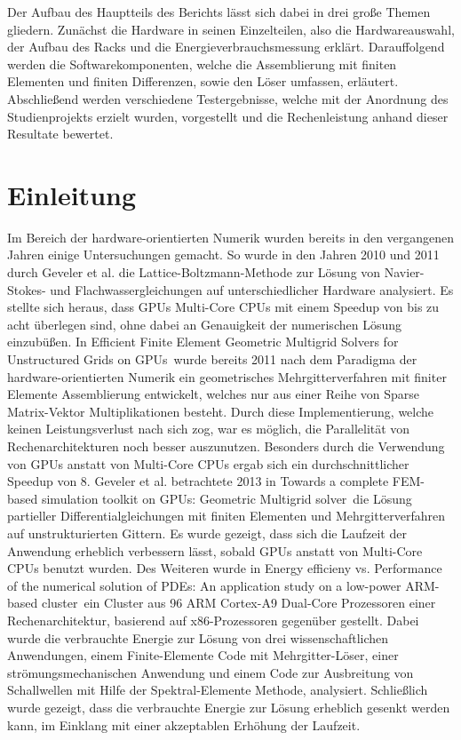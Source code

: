 Der Aufbau des Hauptteils des Berichts lässt sich dabei in drei große Themen gliedern. Zunächst die Hardware in seinen Einzelteilen, also die Hardwareauswahl, der Aufbau des Racks und die Energieverbrauchsmessung erklärt. Darauffolgend werden die Softwarekomponenten, welche die Assemblierung mit finiten Elementen und finiten Differenzen, sowie den Löser umfassen, erläutert. Abschließend werden verschiedene Testergebnisse, welche mit der Anordnung des Studienprojekts erzielt wurden, vorgestellt und die Rechenleistung anhand dieser Resultate bewertet. 



\section{Einleitung}


Im Bereich der hardware-orientierten Numerik wurden bereits in den vergangenen Jahren einige Untersuchungen gemacht. So wurde in den Jahren 2010 und 2011 durch Geveler et al. die Lattice-Boltzmann-Methode zur Lösung von Navier-Stokes- und Flachwassergleichungen auf unterschiedlicher Hardware analysiert. Es stellte sich heraus, dass GPUs Multi-Core CPUs mit einem Speedup von bis zu acht überlegen sind, ohne dabei an Genauigkeit der numerischen Lösung einzubü\ss en. 
In \glqq Efficient Finite Element Geometric Multigrid Solvers for Unstructured Grids on GPUs\grqq\, wurde bereits 2011 nach dem Paradigma der hardware-orientierten Numerik ein geometrisches Mehrgitterverfahren mit finiter Elemente Assemblierung entwickelt, welches nur aus einer Reihe von Sparse Matrix-Vektor Multiplikationen besteht. Durch diese Implementierung, welche keinen Leistungsverlust nach sich zog, war es möglich, die Parallelität von Rechenarchitekturen noch besser auszunutzen. Besonders durch die Verwendung von GPUs anstatt von Multi-Core CPUs ergab sich ein durchschnittlicher Speedup von 8.
Geveler et al. betrachtete 2013 in \glqq 
Towards a complete FEM-based simulation toolkit on GPUs: Geometric Multigrid solver\grqq\, die Lösung partieller Differentialgleichungen mit finiten Elementen und Mehrgitterverfahren auf unstrukturierten Gittern. Es wurde gezeigt, dass sich die Laufzeit der Anwendung erheblich verbessern lässt, sobald GPUs anstatt von Multi-Core CPUs benutzt wurden. 
Des Weiteren wurde in \glqq Energy efficieny vs. Performance of the numerical solution of PDEs: An application study on a low-power ARM-based cluster\grqq\, ein Cluster aus 96 ARM Cortex-A9 Dual-Core Prozessoren einer Rechenarchitektur, basierend auf x86-Prozessoren gegenüber gestellt. Dabei wurde die verbrauchte Energie zur Lösung von drei wissenschaftlichen Anwendungen, einem Finite-Elemente Code mit Mehrgitter-Löser, einer strömungsmechanischen Anwendung und einem Code zur Ausbreitung von Schallwellen mit Hilfe der Spektral-Elemente Methode, analysiert. Schließlich wurde gezeigt, dass die verbrauchte Energie zur Lösung erheblich gesenkt werden kann, im Einklang mit einer akzeptablen Erhöhung der Laufzeit. 

